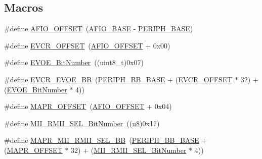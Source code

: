 \subsection*{Macros}
\begin{DoxyCompactItemize}
\item 
\#define \hyperlink{group___g_p_i_o___private___defines_ga0ecdd0dd5180e1ee385c22f66a2cd660}{A\+F\+I\+O\+\_\+\+O\+F\+F\+S\+ET}~(\hyperlink{group___peripheral__memory__map_ga5f7e3eacfcf4c313c25012795148a680}{A\+F\+I\+O\+\_\+\+B\+A\+SE} -\/ \hyperlink{group___peripheral__memory__map_ga9171f49478fa86d932f89e78e73b88b0}{P\+E\+R\+I\+P\+H\+\_\+\+B\+A\+SE})
\item 
\#define \hyperlink{group___g_p_i_o___private___defines_gaf8c24f39392c89142f1b97a418669d5d}{E\+V\+C\+R\+\_\+\+O\+F\+F\+S\+ET}~(\hyperlink{group___g_p_i_o___private___defines_ga0ecdd0dd5180e1ee385c22f66a2cd660}{A\+F\+I\+O\+\_\+\+O\+F\+F\+S\+ET} + 0x00)
\item 
\#define \hyperlink{group___g_p_i_o___private___defines_ga8e4fdee57fe3447cdbc5d00ccab60c18}{E\+V\+O\+E\+\_\+\+Bit\+Number}~((uint8\+\_\+t)0x07)
\item 
\#define \hyperlink{group___g_p_i_o___private___defines_ga6e4f8c4e3def38811ac6c03b4f64240b}{E\+V\+C\+R\+\_\+\+E\+V\+O\+E\+\_\+\+BB}~(\hyperlink{group___peripheral__memory__map_gaed7efc100877000845c236ccdc9e144a}{P\+E\+R\+I\+P\+H\+\_\+\+B\+B\+\_\+\+B\+A\+SE} + (\hyperlink{group___g_p_i_o___private___defines_gaf8c24f39392c89142f1b97a418669d5d}{E\+V\+C\+R\+\_\+\+O\+F\+F\+S\+ET} $\ast$ 32) + (\hyperlink{group___g_p_i_o___private___defines_ga8e4fdee57fe3447cdbc5d00ccab60c18}{E\+V\+O\+E\+\_\+\+Bit\+Number} $\ast$ 4))
\item 
\#define \hyperlink{group___g_p_i_o___private___defines_ga472f80f63d09e365d283675f3466c8a1}{M\+A\+P\+R\+\_\+\+O\+F\+F\+S\+ET}~(\hyperlink{group___g_p_i_o___private___defines_ga0ecdd0dd5180e1ee385c22f66a2cd660}{A\+F\+I\+O\+\_\+\+O\+F\+F\+S\+ET} + 0x04)
\item 
\#define \hyperlink{group___g_p_i_o___private___defines_gad4a9bbd669109039291f942d923ff8ae}{M\+I\+I\+\_\+\+R\+M\+I\+I\+\_\+\+S\+E\+L\+\_\+\+Bit\+Number}~((\hyperlink{group___exported__types_ga92c50087ca0e64fa93fc59402c55f8ca}{u8})0x17)
\item 
\#define \hyperlink{group___g_p_i_o___private___defines_ga00e75433e8a45d7a55c021397cb85aa9}{M\+A\+P\+R\+\_\+\+M\+I\+I\+\_\+\+R\+M\+I\+I\+\_\+\+S\+E\+L\+\_\+\+BB}~(\hyperlink{group___peripheral__memory__map_gaed7efc100877000845c236ccdc9e144a}{P\+E\+R\+I\+P\+H\+\_\+\+B\+B\+\_\+\+B\+A\+SE} + (\hyperlink{group___g_p_i_o___private___defines_ga472f80f63d09e365d283675f3466c8a1}{M\+A\+P\+R\+\_\+\+O\+F\+F\+S\+ET} $\ast$ 32) + (\hyperlink{group___g_p_i_o___private___defines_gad4a9bbd669109039291f942d923ff8ae}{M\+I\+I\+\_\+\+R\+M\+I\+I\+\_\+\+S\+E\+L\+\_\+\+Bit\+Number} $\ast$ 4))

\end{DoxyCompactItemize}

